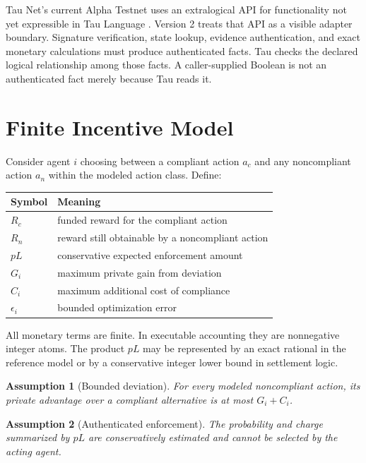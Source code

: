 \documentclass[11pt]{article}
\newtheorem{assumption}{Assumption}
\begin{document}
Tau Net's current Alpha Testnet uses an extralogical API for functionality not
yet expressible in Tau Language \cite{taunetcurrent}.  Version 2 treats that API
as a visible adapter boundary.  Signature verification, state lookup, evidence
authentication, and exact monetary calculations must produce authenticated
facts.  Tau checks the declared logical relationship among those facts.  A
caller-supplied Boolean is not an authenticated fact merely because Tau reads it.

\section{Finite Incentive Model}

Consider agent $i$ choosing between a compliant action $a_c$ and any
noncompliant action $a_n$ within the modeled action class.  Define:

\begin{center}
\begin{tabular}{ll}
\toprule
Symbol & Meaning \\
\midrule
$R_c$ & funded reward for the compliant action \\
$R_n$ & reward still obtainable by a noncompliant action \\
$pL$ & conservative expected enforcement amount \\
$G_i$ & maximum private gain from deviation \\
$C_i$ & maximum additional cost of compliance \\
$\epsilon_i$ & bounded optimization error \\
\bottomrule
\end{tabular}
\end{center}

All monetary terms are finite.  In executable accounting they are nonnegative
integer atoms.  The product $pL$ may be represented by an exact rational in the
reference model or by a conservative integer lower bound in settlement logic.

\begin{assumption}[Bounded deviation]
For every modeled noncompliant action, its private advantage over a compliant
alternative is at most $G_i+C_i$.
\end{assumption}

\begin{assumption}[Authenticated enforcement]
The probability and charge summarized by $pL$ are conservatively estimated and
cannot be selected by the acting agent.
\end{assumption}
\end{document}
